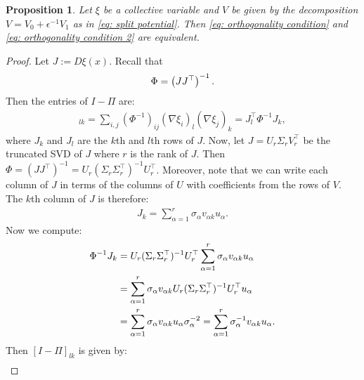 \documentclass[reqno, 12pt]{article}
\newtheorem{proposition}{Proposition}
\begin{document}
\begin{proposition}
\label{prop: oc poc equivalence}
    Let $\xi$ be a collective variable and $V$ be given by the decomposition $V= V_0 + \epsilon^{-1}V_{1}$ as in \eqref{eq: split potential}. Then \eqref{eq: orthogonality condition} and \eqref{eq: orthogonality condition 2} are equivalent. 
\end{proposition}

\begin{proof}
    Let $J := D\xi(x)$. 
    Recall that 
    \begin{align}
        \Phi = \left(JJ^{\top}\right)^{-1}. \notag
    \end{align}
    Then the entries of $I-\Pi$ are:
    \begin{align}
        [I - \Pi]_{lk} = \sum_{i,j} (\Phi^{-1})_{ij} (\nabla \xi_i)_{l} (\nabla \xi_j)_{k} = J^{\top}_{l}\Phi^{-1}J_{k}, %
    \end{align}
    where $J_k$ and $ J_l$ are the $k$th and $l$th rows of $J$. Now, let $J = U_{r}\Sigma_{r}V^{\top}_{r}$ be the truncated SVD of $J$ where $r$ is the rank of $J$. Then $\Phi = \left(JJ^{\top}\right)^{-1} = U_{r}(\Sigma_{r}\Sigma_{r}^{\top})^{-1}U^{\top}_{r}$. Moreover, note that we can write each column of $J$ in terms of the columns of $U$ with coefficients from the rows of $V$. The $k$th column of $J$ is therefore:
    \begin{align}
        J_k = \sum_{\alpha=1}^{r}\sigma_{\alpha}v_{\alpha k}u_{\alpha}. 
    \end{align}
    Now we compute:
    \begin{align}
        \Phi^{-1}J_{k} &= U_{r}(\Sigma_{r}\Sigma_{r}^{\top})^{-1}U^{\top}_{r}\sum_{\alpha=1}^{r}\sigma_{\alpha}v_{\alpha k}u_{\alpha} \\
        &= \sum_{\alpha=1}^{r}\sigma_{\alpha}v_{\alpha k}U_{r}(\Sigma_{r}\Sigma_{r}^{\top})^{-1}U^{\top}_{r}u_{\alpha} \notag\\
        &= \sum_{\alpha=1}^{r}\sigma_{\alpha}v_{\alpha k}u_{\alpha}\sigma_{\alpha}^{-2} = \sum_{\alpha=1}^{r}\sigma_{\alpha}^{-1}v_{\alpha k}u_{\alpha}. \notag
    \end{align}
    Then $[I- \Pi]_{lk}$ is given by:  
    \begin{align}

\end{align}
\end{proof}
\end{document}

